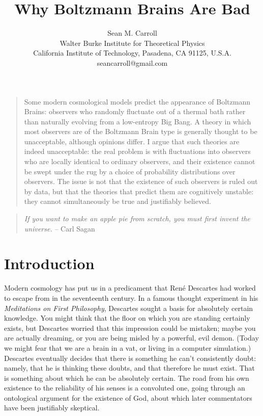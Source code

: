 \documentclass[12pt,letterpaper]{article}
\begin{document}
 

\title{Why Boltzmann Brains Are Bad}

 \author{Sean M. Carroll\\
 Walter Burke Institute for Theoretical Physics\\
 California Institute of Technology, Pasadena, CA 91125, U.S.A.\\
 seancarroll@gmail.com}
\maketitle

\begin{quotation} \noindent
Some modern cosmological models predict the appearance of Boltzmann Brains: observers who randomly fluctuate
out of a thermal bath rather than naturally evolving from a low-entropy Big Bang. 
A theory in which most observers are of the Boltzmann Brain type is generally thought to be unacceptable, although opinions differ. I argue that such theories are indeed unacceptable: the real 
problem is with fluctuations into observers who are locally identical to ordinary observers, and their existence
cannot be swept under the rug by a choice of probability distributions over observers. The issue is not
that the existence of such observers is ruled out by data, but that the theories that predict them are cognitively
unstable: they cannot simultaneously be true and justifiably believed.
\end{quotation}

\tableofcontents


\newpage

\begin{quote}
\emph{If you want to make an apple pie from scratch, you must first invent the universe.} -- Carl Sagan
\end{quote}


\section{Introduction}

Modern cosmology has put us in a predicament that Ren\'e Descartes had worked to escape from in the seventeenth century.
In a famous thought experiment in his \emph{Meditations on First Philosophy}, Descartes sought a basis for absolutely certain knowledge.
You might think that the floor on which you are standing certainly exists, but Descartes worried that this impression could be mistaken; maybe you are actually dreaming, or you are being misled by a powerful, evil demon.
(Today we might fear that we are a brain in a vat, or living in a computer simulation.)
Descartes eventually decides that there is something he can't consistently doubt: namely, that he is thinking these doubts, and that therefore he must exist.
That is something about which he can be absolutely certain.
The road from his own existence to the reliability of his senses is a convoluted one, going through an ontological argument for the existence of God, about which later commentators have been justifiably skeptical.
\end{document}
